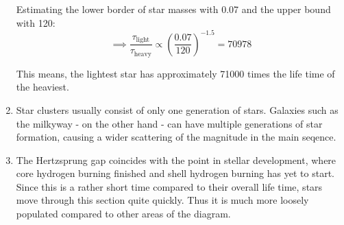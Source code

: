 \documentclass[11pt,a4paper]{scrartcl}
\newcommand{\tlabel}[1]{\ensuremath{\tau_{\mathrm{#1}}}}
\begin{document}
\begin{enumerate}[label=\textbf{\large(\alph*)}, itemsep=\baselineskip]
    Estimating the lower border of star masses with \SI{0.07}{\Msol} and
    the upper bound with \SI{120}{\Msol}:
    \begin{equation*}
        \implies \frac{\tlabel{light}}{\tlabel{heavy}} \propto
        \left(\frac{0.07}{120}\right)^{-1.5} = \num{70978}
    \end{equation*}

    This means, the lightest star has approximately \num{71000} times the life
    time of the heaviest.


\item
    Star clusters usually consist of only one generation of stars.
    Galaxies such as the milkyway - on the other hand - can have multiple
    generations of star formation, causing a wider scattering of the magnitude
    in the main seqence.


\item
    The Hertzsprung gap coincides with the point in stellar development, where
    core hydrogen burning finished and shell hydrogen burning has yet to start.
    Since this is a rather short time compared to their overall life time,
    stars move through this section quite quickly. Thus it is much more loosely
    populated compared to other areas of the diagram.

\end{enumerate}

\newpage


\end{document}
